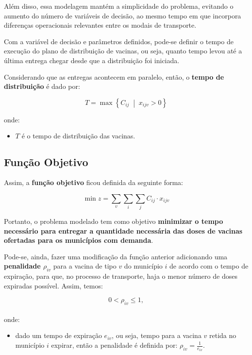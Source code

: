 Além disso, essa modelagem mantém a simplicidade do problema, evitando o aumento do número de variáveis de decisão, ao mesmo tempo em que incorpora diferenças operacionais relevantes entre os modais de transporte.

Com a variável de decisão e parâmetros definidos, pode-se definir o tempo de execução do plano de distribuição de vacinas, ou seja, quanto tempo levou até a última entrega chegar desde que a distribuição foi iniciada.

Considerando que as entregas acontecem em paralelo, então, o \textbf{tempo de distribuição} é dado por:


\[
T = \max \left\{ C_{ij} \;\middle|\; x_{ijv} > 0 \right\}
\]

onde:
\begin{itemize}
    \item $T$ é o tempo de distribuição das vacinas.
\end{itemize}

\subsection{Função Objetivo}

Assim, a \textbf{função objetivo} ficou definida da seguinte forma:

\begin{equation}
    \min z = \sum_{v} \sum_{i} \sum_{j} C_{ij} \cdot x_{ijv}
    \label{eq:intermunicipal_sem_penalidade}
\end{equation}

Portanto, o problema modelado tem como objetivo \textbf{minimizar o tempo necessário para entregar a quantidade necessária das doses de vacinas ofertadas para os municípios com demanda}.

Pode-se, ainda, fazer uma modificação da função anterior adicionando uma \textbf{penalidade $\rho_{iv}$} para a vacina de tipo $v$ do município $i$ de acordo com o tempo de expiração, para que, no processo de transporte, haja o menor número de doses expiradas possível. Assim, temos:


\[ 0 < \rho_{iv} \le 1, \]  \\
onde:
\begin{itemize}
    \item dado um tempo de expiração $e_{iv}$, ou seja, tempo para a vacina $v$ retida no município $i$ expirar, então a penalidade é definida por: $\rho_{iv} = \frac{1}{e_{iv}}$.
\end{itemize}

